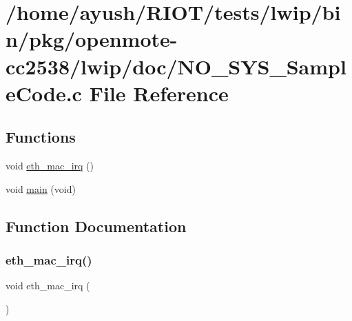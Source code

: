 \hypertarget{openmote-cc2538_2lwip_2doc_2NO__SYS__SampleCode_8c}{}\section{/home/ayush/\+R\+I\+O\+T/tests/lwip/bin/pkg/openmote-\/cc2538/lwip/doc/\+N\+O\+\_\+\+S\+Y\+S\+\_\+\+Sample\+Code.c File Reference}
\label{openmote-cc2538_2lwip_2doc_2NO__SYS__SampleCode_8c}
\subsection*{Functions}
\begin{DoxyCompactItemize}
\item 
void \hyperlink{openmote-cc2538_2lwip_2doc_2NO__SYS__SampleCode_8c_aa86345e2411c6c283cae728f797c4b94}{eth\+\_\+mac\+\_\+irq} ()
\item 
void \hyperlink{openmote-cc2538_2lwip_2doc_2NO__SYS__SampleCode_8c_a6288eba0f8e8ad3ab1544ad731eb7667}{main} (void)
\end{DoxyCompactItemize}


\subsection{Function Documentation}
\mbox{\label{openmote-cc2538_2lwip_2doc_2NO__SYS__SampleCode_8c_aa86345e2411c6c283cae728f797c4b94}} 
\subsubsection{\texorpdfstring{eth\+\_\+mac\+\_\+irq()}{eth\_mac\_irq()}}
{\footnotesize\ttfamily void eth\+\_\+mac\+\_\+irq (\begin{DoxyParamCaption}{ }\end{DoxyParamCaption})}

